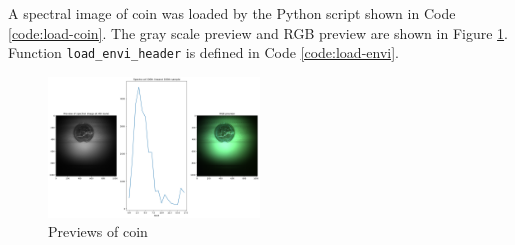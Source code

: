 A spectral image of coin was loaded by the Python script shown in Code \ref{code:load-coin}. The gray scale preview and RGB preview are shown in Figure \ref{fig:coin-preview}.
Function \texttt{load\_envi\_header} is defined in Code \ref{code:load-envi}.


\begin{figure}[H]
    \centering
    \caption{Previews of coin}
    \label{fig:coin-preview}
    \includegraphics[width=0.5\textwidth]{./fig-task3/coin.png}
\end{figure}
